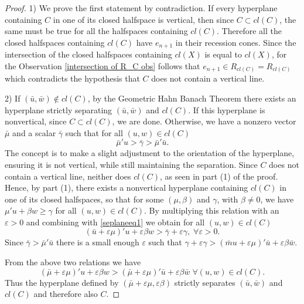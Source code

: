 \documentclass[11pt,a4paper,oneside,openany]{book}
\numberwithin{definition}{section}
\numberwithin{theorem}{section}
\numberwithin{problem}{section}
\begin{document}
\begin{proof} 
    1) We prove the first statement by contradiction. If every hyperplane containing $C$ in one of its closed halfspace is vertical, then since $C \subset cl(C)$, the same must be true for all the halfspaces containing $cl(C)$. Therefore all the closed halfspaces containing $cl(C)$ have $e_{n+1}$ in their recession cones. Since the intersection of the closed halfspaces containing $cl(X)$ is equal to $cl(X)$, for the Observation \ref{intersection of R_C obs} follows that $e_{n+1} \in R_{cl(C)} = R_{cl(C)}$ which contradicts the hypothesis that $C$ does not contain a vertical line. 
    \hfill \\
    \par 2) If \((\bar u, \bar w) \notin cl(C)\), by the Geometric Hahn Banach Theorem there exists an hyperplane strictly separating $(\bar u, \bar w)$ and $cl(C)$. If this hyperplane is nonvertical, since $C \subset cl(C)$, we are done. Otherwise, we have a nonzero vector $\bar \mu$ and a scalar $\bar \gamma$ such that for all $(u,w) \in cl(C)$
    \begin{equation}\label{seplaneeq1}
        \bar \mu' u > \bar \gamma > \bar \mu' \bar u. \hspace{1cm} 
    \end{equation}
     The concept is to make a slight adjustment to the orientation of the hyperplane, ensuring it is not vertical, while still maintaining the separation. Since $C$ does not contain a vertical line, neither does $cl(C)$, as seen in part (1) of the proof. Hence, by part (1), there exists a nonvertical hyperplane containing $cl(C)$ in one of its closed halfspaces, so that for some $(\mu,\beta)$ and $\gamma$, with $\beta \neq 0$, we have $\mu' u + \beta w \geq \gamma$ for all \((u,w) \in cl(C)\). By multiplying this relation with an \(\varepsilon > 0\) and combining with \eqref{seplaneeq1} we obtain for all \( (u,w) \in cl(C)\)
    \[
        (\bar u + \varepsilon \mu )'u + \varepsilon \beta w > \bar \gamma + \varepsilon \gamma, \; \forall \varepsilon > 0.  
    \]
    Since $\bar \gamma> \bar \mu' \bar u$ there is a small enough $\varepsilon$ such that $\gamma + \varepsilon \gamma > (\bar mu + \varepsilon \mu)'\bar u + \varepsilon \beta \bar w$.

From the above two relations we have
\[(\bar \mu + \varepsilon \mu)'u + \varepsilon \beta w > (\bar \mu + \varepsilon \mu)'\bar u + \varepsilon \beta \bar w \; \forall (u,w) \in cl(C).\]
Thus the hyperplane defined by $(\bar \mu + \varepsilon \mu,  \varepsilon \beta)$ strictly separates $(\bar u, \bar w)$ and $cl(C)$ and therefore also $C$.
\end{proof}
\end{document}
